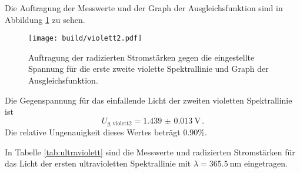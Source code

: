 Die Auftragung der Messwerte und der Graph der Ausgleichsfunktion sind in Abbildung \ref{fig:violett2} zu sehen.

\begin{figure}
  \centering
  \texttt{[image: build/violett2.pdf]}
  \caption{Auftragung der radizierten Stromstärken gegen die eingestellte Spannung für die erste zweite violette Spektrallinie und Graph der Ausgleichsfunktion.}
  \label{fig:violett2}
\end{figure}

Die Gegenspannung für das einfallende Licht der zweiten violetten Spektrallinie ist
\begin{equation*}
  U_{g,\text{violett2}} = \SI{1.439(0013)}{\volt}\,.
\end{equation*}
Die relative Ungenauigkeit dieses Wertes beträgt 0.90\%.

In Tabelle \ref{tab:ultraviolett} sind die Messwerte und radizierten Stromstärken
für das Licht der ersten ultravioletten Spektrallinie mit $\lambda = \SI{365.5}{\nano\meter}$
eingetragen.

